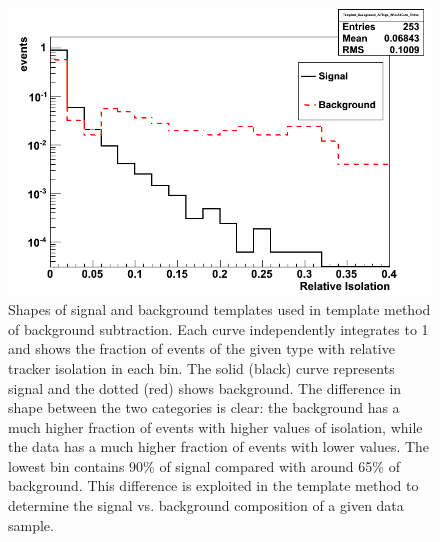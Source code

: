  \begin{figure}[htb]
  \begin{center}
    \includegraphics[width=360pt]{Figures/TemplateShapes-01Mar11-lines.png}
  \end{center}
  \caption[\fixspacing Shapes of signal and background templates used in 
    template method of background subtraction]{
    \fixspacing Shapes of signal and background templates 
    used in template method of background subtraction.
    Each curve independently integrates to 1 
    and shows the fraction of events of the given type 
    with relative tracker isolation in each bin.  
    The solid (black) curve represents signal 
    and the dotted (red) shows background.  
    The difference in shape between the two categories 
    is clear: 
    the background has a much higher fraction of events 
    with higher values of isolation, 
    while the data has a much higher fraction of events 
    with lower values.  
    The lowest bin contains 90\% of signal compared with 
    around 65\% of background.  
    This difference is exploited 
    in the template method 
    to determine the 
    signal vs. background composition of a given 
    data sample.  
  }
  \label{fig:TemplateShapes}
 \end{figure}

